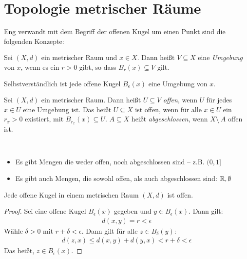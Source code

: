 \section{Topologie metrischer Räume}
Eng verwandt mit dem Begriff der offenen Kugel um einen Punkt sind die folgenden 
Konzepte:

\begin{Definition}{%
	Sei $(X,d)$ ein metrischer Raum und $x \in X$. Dann heißt $V \subseteq X$ eine 
	\emph{Umgebung} von $x$, wenn es ein $r > 0$ gibt, so dass $B_r(x) \subseteq V$ 
	gilt.
}\end{Definition}

\begin{Beispiel}
	Selbstverständlich ist jede offene Kugel $B_\epsilon(x)$ eine Umgebung von $x$.
\end{Beispiel}

\begin{Definition}{%
	Sei $(X,d)$ ein metrischer Raum. Dann heißt $U \subseteq V$ \emph{offen}, wenn 
	$U$ für jedes $x \in U$ eine Umgebung ist.
	Das heißt $U \subseteq X$ ist offen, wenn für alle $x \in U$ ein $r_x > 0$ 
	existiert, mit $B_{r_x}(x) \subseteq U$. 
	$A \subseteq X$ heißt \emph{abgeschlossen}, wenn $X \setminus\ A$ offen ist. 
}\end{Definition}

\begin{Bemerkung}~
	\begin{itemize}
		\item Es gibt Mengen die weder offen, noch abgeschlossen sind -- z.B.  $(0,1]$
		\item Es gibt auch Mengen, die sowohl offen, als auch abgeschlossen sind:
		$\mathbb{R}, \emptyset$
	\end{itemize}
\end{Bemerkung}

\begin{Lemma}{%
	Jede offene Kugel in einem metrischen Raum $(X,d)$ ist offen.
}\end{Lemma}

\begin{proof}
	Sei eine offene Kugel $B_\epsilon(x)$ gegeben und $y \in B_\epsilon(x)$. 
	Dann gilt:
	\begin{align*}
		d(x,y) = r < \epsilon
	\end{align*}
	Wähle $\delta > 0$ mit $r + \delta < \epsilon$. Dann gilt für alle 
	$z \in B_\delta (y)$:
	\begin{align*}
		d(z,x) \leq d(x,y) + d(y,x) < r + \delta < \epsilon
	\end{align*}
	Das heißt, $z \in B_\epsilon(x)$.
\end{proof}
